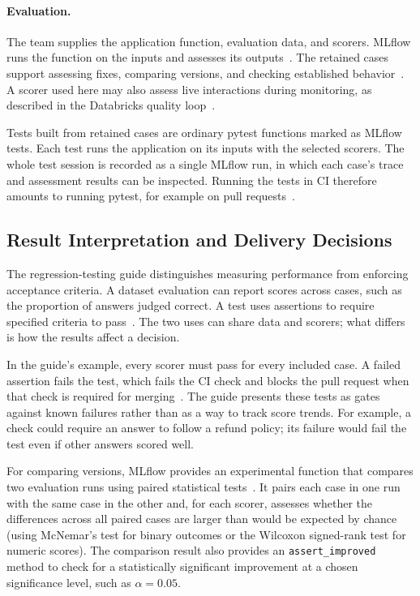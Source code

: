 \paragraph{Evaluation.}
The team supplies the application function, evaluation data, and scorers.
MLflow runs the function on the inputs and assesses its
outputs~\parencite{MLflow:RegressionGuide}. The retained cases support
assessing fixes, comparing versions, and checking established
behavior~\parencite{MLflow:Datasets}. A scorer used here may also assess live
interactions during monitoring, as described in the Databricks quality
loop~\parencite{Databricks:QualityLoop}.

Tests built from retained cases are ordinary pytest functions marked as MLflow
tests. Each test runs the application on its inputs with the selected scorers.
The whole test session is recorded as a single MLflow run, in which each
case's trace and assessment results can be inspected. Running the tests in CI
therefore amounts to running pytest, for example on pull
requests~\parencite{MLflow:RegressionGuide}.

\subsection{Result Interpretation and Delivery Decisions}

The regression-testing guide distinguishes measuring performance from enforcing
acceptance criteria. A dataset evaluation can report scores across cases, such
as the proportion of answers judged correct. A test uses assertions to require
specified criteria to pass~\parencite{MLflow:RegressionGuide}. The two uses
can share data and scorers; what differs is how the results affect a decision.

In the guide's example, every scorer must pass for every included case. A
failed assertion fails the test, which fails the CI check and blocks the pull
request when that check is required for
merging~\parencite{MLflow:RegressionGuide}. The guide presents these tests as
gates against known failures rather than as a way to track score trends. For
example, a check could require an answer to follow a refund policy; its failure
would fail the test even if other answers scored well.

For comparing versions, MLflow provides an experimental function that compares
two evaluation runs using paired statistical
tests~\parencite{MLflow:CompareEvaluations}. It pairs each case in one run
with the same case in the other and, for each scorer, assesses whether the
differences across all paired cases are larger than would be expected by
chance (using McNemar's test for binary outcomes or the Wilcoxon signed-rank
test for numeric scores). The comparison result also provides an
\texttt{assert\_improved} method to check for a statistically significant
improvement at a chosen significance level, such as $\alpha = 0.05$.

